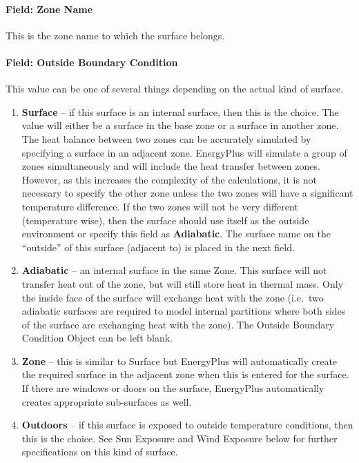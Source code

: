 \paragraph{Field: Zone Name}\label{field-zone-name-13}

This is the zone name to which the surface belongs.

\paragraph{Field: Outside Boundary Condition}\label{field-outside-boundary-condition-3}

This value can be one of several things depending on the actual kind of surface.

\begin{enumerate}
  \item
    \textbf{Surface} -- if this surface is an internal surface, then this is the choice. The value will either be a surface in the base zone or a surface in another zone. The heat balance between two zones can be accurately simulated by specifying a surface in an adjacent zone. EnergyPlus will simulate a group of zones simultaneously and will include the heat transfer between zones. However, as this increases the complexity of the calculations, it is not necessary to specify the other zone unless the two zones will have a significant temperature difference. If the two zones will not be very different (temperature wise), then the surface should use itself as the outside environment or specify this field as \textbf{Adiabatic}. The surface name on the ``outside'' of this surface (adjacent to) is placed in the next field.
  \item
    \textbf{Adiabatic} -- an internal surface in the same Zone. This surface will not transfer heat out of the zone, but will still store heat in thermal mass. Only the inside face of the surface will exchange heat with the zone (i.e.~two adiabatic surfaces are required to model internal partitions where both sides of the surface are exchanging heat with the zone). The Outside Boundary Condition Object can be left blank.
  \item
    \textbf{Zone} -- this is similar to Surface but EnergyPlus will automatically create the required surface in the adjacent zone when this is entered for the surface. If there are windows or doors on the surface, EnergyPlus automatically creates appropriate sub-surfaces as well.
  \item
    \textbf{Outdoors} -- if this surface is exposed to outside temperature conditions, then this is the choice. See Sun Exposure and Wind Exposure below for further specifications on this kind of surface.

\end{enumerate}
